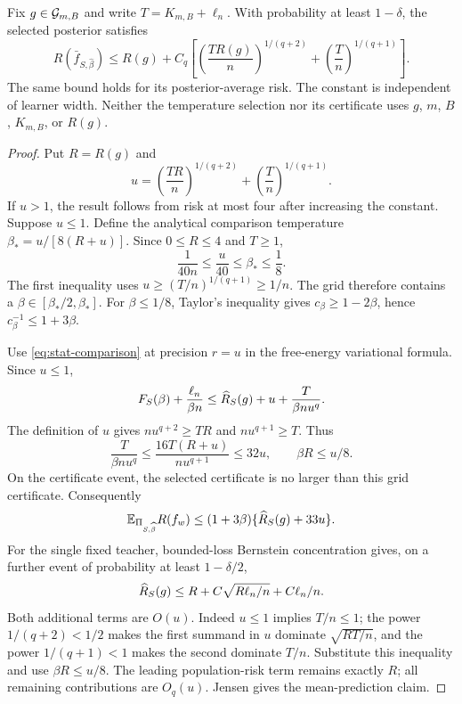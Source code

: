 \begin{theorem}
\label{thm:optimistic-statistics}
Fix $g\in\mathcal G_{m,B}$ and write $T=K_{m,B}+\ell_n$. With probability at least $1-\delta$, the selected posterior satisfies
\begin{equation}
 R(\bar f_{S,\widehat\beta})\le R(g)+C_q\left[
       \left(\frac{T R(g)}n\right)^{1/(q+2)}
       +\left(\frac Tn\right)^{1/(q+1)}\right].
 \label{eq:optimistic-statistical-oracle}
\end{equation}
The same bound holds for its posterior-average risk. The constant is independent of learner width. Neither the temperature selection nor its certificate uses $g$, $m$, $B$, $K_{m,B}$, or $R(g)$.
\end{theorem}
\begin{proof}
Put $R=R(g)$ and
\[
 u=\left(\frac{TR}n\right)^{1/(q+2)}
       +\left(\frac Tn\right)^{1/(q+1)}.
\]
If $u>1$, the result follows from risk at most four after increasing the constant. Suppose $u\le1$. Define the analytical comparison temperature
$\beta_*=u/[8(R+u)]$. Since $0\le R\le4$ and $T\ge1$,
\[
 \frac1{40n}\le\frac{u}{40}\le\beta_*\le\frac18.
\]
The first inequality uses $u\ge(T/n)^{1/(q+1)}\ge1/n$.
The grid therefore contains a $\beta\in[\beta_*/2,\beta_*]$.
For $\beta\le1/8$, Taylor's inequality gives
$c_\beta\ge1-2\beta$, hence $c_\beta^{-1}\le1+3\beta$.

Use \eqref{eq:stat-comparison} at precision $r=u$ in the free-energy variational formula. Since $u\le1$,
\[
 F_S(\beta)+\frac{\ell_n}{\beta n}
 \le\widehat R_S(g)+u+\frac{T}{\beta n u^q}.
\]
The definition of $u$ gives
$nu^{q+2}\ge TR$ and $nu^{q+1}\ge T$. Thus
\[
 \frac{T}{\beta n u^q}
 \le\frac{16T(R+u)}{nu^{q+1}}\le32u,
 \qquad \beta R\le u/8.
\]
On the certificate event, the selected certificate is no larger than this grid certificate. Consequently
\[
 \mathbb E_{\Pi_{S,\widehat\beta}}R(f_w)
 \le (1+3\beta)\{\widehat R_S(g)+33u\}.
\]
For the single fixed teacher, bounded-loss Bernstein concentration gives, on a further event of probability at least $1-\delta/2$,
\[
 \widehat R_S(g)\le R+C\sqrt{R\ell_n/n}+C\ell_n/n.
\]
Both additional terms are $O(u)$. Indeed $u\le1$ implies $T/n\le1$; the power $1/(q+2)<1/2$ makes the first summand in $u$ dominate $\sqrt{RT/n}$, and the power $1/(q+1)<1$ makes the second dominate $T/n$. Substitute this inequality and use $\beta R\le u/8$. The leading population-risk term remains exactly $R$; all remaining contributions are $O_q(u)$. Jensen gives the mean-prediction claim.
\end{proof}


